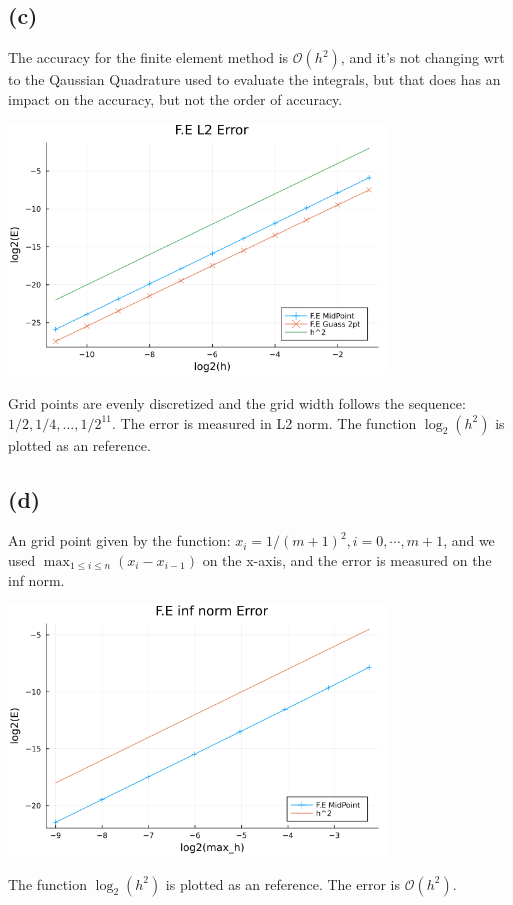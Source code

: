 \documentclass[]{article}
\begin{document}
    \subsection*{(c)}
        The accuracy for the finite element method is $\mathcal{O}(h^2)$, and it's not changing wrt to the Qaussian Quadrature used to evaluate the integrals, but that does has an impact on the accuracy, but not the order of accuracy. 
        \begin{center}
            \includegraphics[width=10cm]{problem1C.png}
        \end{center}
        Grid points are evenly discretized and the grid width follows the sequence: $1/2, 1/4, ..., 1/2^{11}$. The error is measured in L2 norm. The function $\log_2(h^2)$ is plotted as an reference. 

    \subsection*{(d)}
        An grid point given by the function: $x_i = 1/(m + 1)^2, i = 0, \cdots, m + 1$, and we used $\max_{1\le i \le n}(x_i - x_{i - 1})$ on the x-axis, and the error is measured on the inf norm. 
        \begin{center}
            \includegraphics[width=10cm]{problem1D.png}
        \end{center}
        The function $\log_2(h^2)$ is plotted as an reference. The error is $\mathcal{O}(h^2)$.
\end{document}
